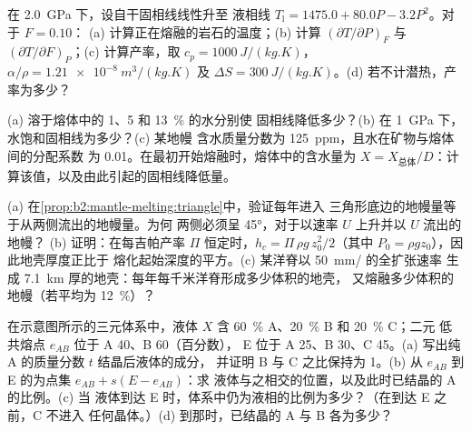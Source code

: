 \begin{exercise}[$\star\star$]\label{exo:b2:mantle-melting:8}
在 \qty{2.0}{GPa} 下，设自干固相线线性升至
液相线 $T_{\mathrm l} = 1475.0 + 80.0P - 3.2P^2$。对于 $F = 0.10$：
(a) 计算正在熔融的岩石的温度；(b) 计算 $(\partial
T/\partial P)_F$ 与 $(\partial T/\partial F)_P$；(c) 计算产率，取
$c_p = \qty{1000}{J/(kg.K)}$，$\alpha/\rho = \qty{1.21e-8}{m^3/(kg.K)}$ 及
$\Delta S = \qty{300}{J/(kg.K)}$。(d) 若不计潜热，产率为多少？
\end{exercise}

\begin{exercise}[$\star\star$]\label{exo:b2:mantle-melting:9}
(a) 溶于熔体中的 1、5 和 \qty{13}{\percent} 的水分别使
固相线降低多少？(b) 在 \qty{1}{GPa} 下，水饱和固相线为多少？(c) 某地幔
含水质量分数为 \qty{125}{ppm}，且水在矿物与熔体间的分配系数
为 0.01。在最初开始熔融时，熔体中的含水量为 $X =
X_{\text{总体}}/D$：计算该值，以及由此引起的固相线降低量。
\end{exercise}

\begin{exercise}[$\star\star\star$]\label{exo:b2:mantle-melting:10}
(a) 在\cref{prop:b2:mantle-melting:triangle}中，验证每年进入
三角形底边的地幔量等于从两侧流出的地幔量。为何
两侧必须呈 \ang{45}，对于以速率 $U$ 上升并以 $U$ 流出的地幔？
(b) 证明：在每吉帕产率 $\Pi$ 恒定时，$h_c = \Pi\,\rho
g\,z_0^2/2$（其中 $P_0 = \rho g z_0$），因此地壳厚度正比于
熔化起始深度的平方。(c) 某洋脊以 \qty{50}{mm/} 的全扩张速率
生成 \qty{7.1}{km} 厚的地壳：每年每千米洋脊形成多少体积的地壳，
又熔融多少体积的地幔（若平均为
\qty{12}{\percent}）？
\end{exercise}

\begin{exercise}[$\star\star\star$]\label{exo:b2:mantle-melting:11}
在示意图所示的三元体系中，液体 $X$ 含
\qty{60}{\percent} A、\qty{20}{\percent} B 和 \qty{20}{\percent} C；二元
低共熔点 $e_{AB}$ 位于 A 40、B 60（百分数）， E 位于
A 25、B 30、C 45。(a) 写出纯 A 的质量分数 $t$ 结晶后液体的成分，
并证明 B 与 C 之比保持为 1。(b) 从
$e_{AB}$ 到 E 的为点集 $e_{AB} + s(E - e_{AB})$：求
液体与之相交的位置，以及此时已结晶的 A 的比例。(c) 当
液体到达 E 时，体系中仍为液相的比例为多少？（在到达 E 之前，C 不进入
任何晶体。）(d) 到那时，已结晶的 A 与 B 各为多少？
\end{exercise}

